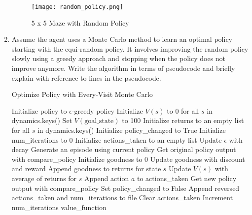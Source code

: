\documentclass[letterpaper]{article} %
\begin{document}
\begin{enumerate}
	\begin{figure}[htbp]
	  \centering
	  \texttt{[image: random\_policy.png]}
	  \caption{5 x 5 Maze with Random Policy}
	  \label{fig:random_policy}
	\end{figure}

    \item Assume the agent uses a Monte Carlo method to learn an optimal policy starting with the equi-random policy. It involves improving the random policy slowly using a greedy approach and stopping when the policy does not improve anymore. Write the algorithm in terms of pseudocode and briefly explain with reference to lines in the pseudocode.


    \begin{algorithm}
    \caption{Optimize Policy with Every-Visit Monte Carlo}
    \begin{algorithmic}[1]
    \State Initialize policy to $\epsilon$-greedy policy \label{alg:greedy_policy}
    \State Initialize $V(s)$ to 0 for all $s$ in dynamics.keys()
	\State Set $V(\text{goal\_state})$ to 100 \label{alg:high_value_goal}
    \State Initialize returns to an empty list for all $s$ in dynamics.keys()
    \State Initialize policy\_changed to True
    \State Initialize num\_iterations to 0
    \State Initialize actions\_taken to an empty list
	\State Update $\epsilon$ with decay
	\State Generate an episode using current policy
	\State Get original policy output with compare\_policy
	\State Initialize goodness to 0
	\label{alg:reversed_episode}
	    \State Update goodness with discount and reward
	    \State Append goodness to returns for state $s$
	    \State Update $V(s)$ with average of returns for $s$
	    \State Append action $a$ to actions\_taken
	\EndFor
	\State Get new policy output with compare\_policy \label{alg:action_compare}
	    \State Set policy\_changed to False
	    \State Append reversed actions\_taken and num\_iterations to file
	\EndIf
	\State Clear actions\_taken
	\State Increment num\_iterations
    \EndWhile
    \State \Return value\_function
    \end{algorithmic}
      \label{alg:every_visit_mc}
    \end{algorithm}


\end{enumerate}
\end{document}
